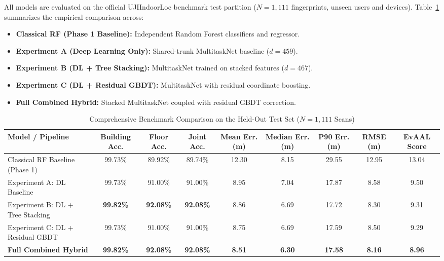 All models are evaluated on the official UJIIndoorLoc benchmark test partition ($N=1{,}111$ fingerprints, unseen users and devices). Table~\ref{tab:hybrid-comparison} summarizes the empirical comparison across:
\begin{itemize}
    \item \textbf{Classical RF (Phase 1 Baseline):} Independent Random Forest classifiers and regressor.
    \item \textbf{Experiment A (Deep Learning Only):} Shared-trunk MultitaskNet baseline ($d=459$).
    \item \textbf{Experiment B (DL + Tree Stacking):} MultitaskNet trained on stacked features ($d=467$).
    \item \textbf{Experiment C (DL + Residual GBDT):} MultitaskNet with residual coordinate boosting.
    \item \textbf{Full Combined Hybrid:} Stacked MultitaskNet coupled with residual GBDT correction.
\end{itemize}

\begin{table}[!t]
\centering
\caption{Comprehensive Benchmark Comparison on the Held-Out Test Set ($N=1{,}111$ Scans)}
\label{tab:hybrid-comparison}
\renewcommand{\arraystretch}{1.18}
\begin{tabular}{@{}lcccccccc@{}}
\toprule
\textbf{Model / Pipeline} & \textbf{Building Acc.} & \textbf{Floor Acc.} & \textbf{Joint Acc.} & \textbf{Mean Err. (m)} & \textbf{Median Err. (m)} & \textbf{P90 Err. (m)} & \textbf{RMSE (m)} & \textbf{EvAAL Score} \\
\midrule
Classical RF Baseline (Phase 1) & 99.73\% & 89.92\% & 89.74\% & 12.30 & 8.15 & 29.55 & 12.95 & 13.04 \\
Experiment A: DL Baseline       & 99.73\% & 91.00\% & 91.00\% & 8.95  & 7.04 & 17.87 & 8.58 & 9.50  \\
Experiment B: DL + Tree Stacking & \textbf{99.82\%} & \textbf{92.08\%} & \textbf{92.08\%} & 8.86  & 6.69 & 17.72 & 8.30 & 9.31  \\
Experiment C: DL + Residual GBDT& 99.73\% & 91.00\% & 91.00\% & 8.75  & 6.69 & 17.59 & 8.50 & 9.29  \\
\textbf{Full Combined Hybrid}   & \textbf{99.82\%} & \textbf{92.08\%} & \textbf{92.08\%} & \textbf{8.51}  & \textbf{6.30} & \textbf{17.58} & \textbf{8.16} & \textbf{8.96}  \\
\bottomrule
\end{tabular}
\end{table}

